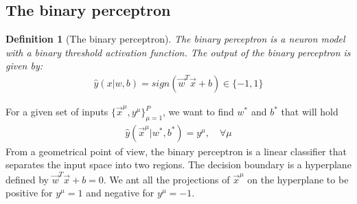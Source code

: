 \documentclass[11pt]{book} %
\newtheorem{definition}{Definition}[section]
\begin{document}
%
% 

\subsection{The binary perceptron}

\begin{definition}[The binary perceptron]
    The binary perceptron is a neuron model with a binary threshold activation function. The output of the binary perceptron is given by:
    \begin{align}
        \hat{y}(x|w,b) = sign(\vec{w}^T \vec{x} + b) \in \{-1, 1\}
    \end{align}
\end{definition}
For a given set of inputs $\{\vec{x}^\mu, y^\mu\}_{\mu=1}^{P}$, we want to find $w^*$ and $b^*$ that will hold 
\begin{align}
    \hat{y}(\vec{x}^\mu|w^*,b^*) = y^\mu, \quad \forall \mu
\end{align}
From a geometrical point of view, the binary perceptron is a linear classifier that separates the input space into two regions. 
The decision boundary is a hyperplane defined by $\vec{w}^T \vec{x} + b = 0$.
We ant all the projections of $\vec{x}^\mu$ on the hyperplane to be positive for $y^\mu = 1$ and negative for $y^\mu = -1$.
\end{document}

